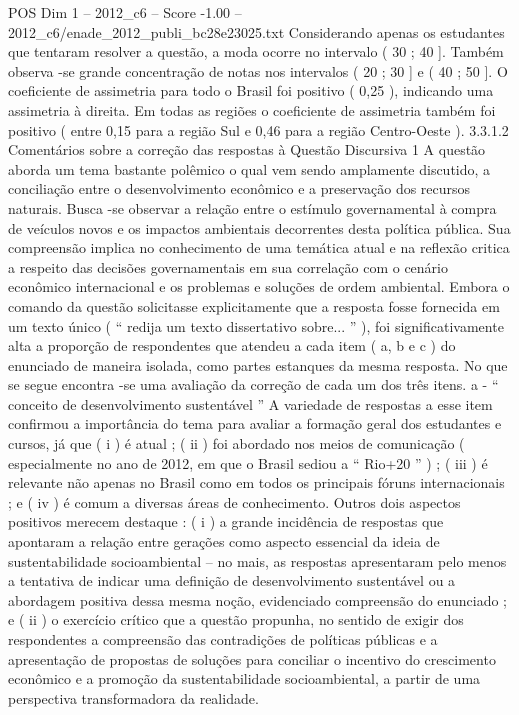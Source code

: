 \begin{textsample}{POS Dim 1 – 2012\_c6 – Score -1.00 – 2012\_c6/enade\_2012\_publi\_bc28e23025.txt}
Considerando apenas os estudantes que tentaram resolver a questão, a moda ocorre no intervalo ( 30 ; 40 ].
Também observa -se grande concentração de notas nos intervalos ( 20 ; 30 ] e ( 40 ; 50 ].
O coeficiente de assimetria para todo o Brasil foi positivo ( 0,25 ), indicando uma assimetria à direita.
Em todas as regiões o coeficiente de assimetria também foi positivo ( entre 0,15 para a região Sul e 0,46 para a região Centro-Oeste ). 3.3.1.2 Comentários sobre a correção das respostas à Questão Discursiva 1 A questão aborda um tema bastante polêmico o qual vem sendo amplamente discutido, a conciliação entre o desenvolvimento econômico e a preservação dos recursos naturais.
Busca -se observar a relação entre o estímulo governamental à compra de veículos novos e os impactos ambientais decorrentes desta política pública.
Sua compreensão implica no conhecimento de uma temática atual e na reflexão critica a respeito das decisões governamentais em sua correlação com o cenário econômico internacional e os problemas e soluções de ordem ambiental.
Embora o comando da questão solicitasse explicitamente que a resposta fosse fornecida em um texto único ( “ redija um texto dissertativo sobre... ” ), foi significativamente alta a proporção de respondentes que atendeu a cada item ( a, b e c ) do enunciado de maneira isolada, como partes estanques da mesma resposta.
No que se segue encontra -se uma avaliação da correção de cada um dos três itens. a - “ conceito de desenvolvimento sustentável ” A variedade de respostas a esse item confirmou a importância do tema para avaliar a formação geral dos estudantes e cursos, já que ( i ) é atual ; ( ii ) foi abordado nos meios de comunicação ( especialmente no ano de 2012, em que o Brasil sediou a “ Rio+20 ” ) ; ( iii ) é relevante não apenas no Brasil como em todos os principais fóruns internacionais ; e ( iv ) é comum a diversas áreas de conhecimento.
Outros dois aspectos positivos merecem destaque : ( i ) a grande incidência de respostas que apontaram a relação entre gerações como aspecto essencial da ideia de sustentabilidade socioambiental – no mais, as respostas apresentaram pelo menos a tentativa de indicar uma definição de desenvolvimento sustentável ou a abordagem positiva dessa mesma noção, evidenciado compreensão do enunciado ; e ( ii ) o exercício crítico que a questão propunha, no sentido de exigir dos respondentes a compreensão das contradições de políticas públicas e a apresentação de propostas de soluções para conciliar o incentivo do crescimento econômico e a promoção da sustentabilidade socioambiental, a partir de uma perspectiva transformadora da realidade.

\end{textsample}
